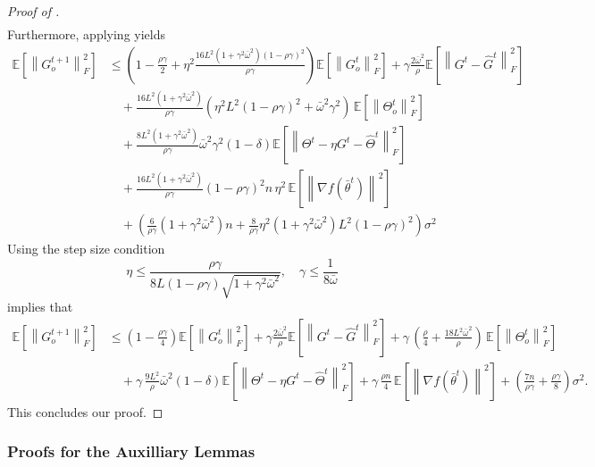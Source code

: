 \documentclass[10pt]{article} %
\theoremstyle{plain}
\theoremstyle{definition}
\theoremstyle{remark}
\newcommand{\prm}{\theta}
\newcommand{\bw}{\bar{\omega}}
\newcommand{\avgtheta}{\bar{\prm}}
\newcommand{\norm}[1]{\left\| #1 \right\|}
\newcommand{\nl}{\nonumber\\}
\begin{document}
\begin{proof}[Proof of ]
\begin{align*}
\end{align*}
Furthermore, applying  yields
\begin{align*}
\mathbb{E} \left[ \norm{G_o^{t+1}}_F^2 \right] & \leq \left( 1 - \frac{ \rho \gamma }{2} + \eta^2 \frac{16L^2 (1 + \gamma^2 \bw^2) ( 1 - \rho \gamma)^2 }{ \rho \gamma } \right) \mathbb{E} \left[ \norm{ G_o^t }_F^2 \right] + \gamma \frac{ 2 \bw^2}{ \rho } \mathbb{E} \left[ \norm{ G^t - \hat{G}^t }_F^2 \right] \nl 
& \quad + \frac{16 L^2 (1 + \gamma^2 \bw^2)}{\rho \gamma} ( \eta^2 L^2 (1 - \rho\gamma)^2 + \bw^2 \gamma^2 ) \, \mathbb{E} \left[ \norm{ \Theta_o^t}_F^2 \right] \nl 
& \quad + \frac{8 L^2(1 + \gamma^2 \bw^2)}{ \rho \gamma } \bw^2 \gamma^2 (1 - \delta) \mathbb{E} \left[ \norm{ \Theta^t - \eta G^t - \hat{\Theta}^t }_F^2 \right] \nl 
& \quad + \frac{16 L^2 (1 + \gamma^2 \bw^2)}{\rho \gamma} (1 - \rho \gamma)^2 n \, \eta^2 \, \mathbb{E} \left[ \norm{ \nabla f( \avgtheta^t ) }^2 \right] \nl 
& \quad + \left( \frac{6}{\rho \gamma} \left( 1 + \gamma^2 \bw^2 \right) n + \frac{8}{\rho \gamma} \eta^2 (1 + \gamma^2 \bw^2) L^2 (1 - \rho \gamma)^2 \right) \sigma^2 
\end{align*}
Using the step size condition 
\begin{equation} \label{eq:eta_gcond_b}
\eta \leq \frac{ \rho \gamma }{ 8L (1-\rho\gamma) \sqrt{1 + \gamma^2 \bw^2} }, \quad \gamma \leq \frac{1}{8 \bw}
\end{equation}
implies that 
\begin{align*}
\mathbb{E} \left[ \norm{G_o^{t+1}}_F^2 \right] & \leq \left( 1 - \frac{ \rho \gamma }{4} \right) \mathbb{E} \left[ \norm{ G_o^t }_F^2 \right] + \gamma \frac{ 2 \bw^2}{ \rho } \mathbb{E} \left[ \norm{ G^t - \hat{G}^t }_F^2 \right] + \gamma \, \left( \frac{\rho}{4} + \frac{18 L^2 \bw^2}{\rho} \right) \, \mathbb{E} \left[ \norm{ \Theta_o^t}_F^2 \right] \nl 
& \quad + \gamma \, \frac{9 L^2}{ \rho } \bw^2 (1 - \delta) \mathbb{E} \left[ \norm{ \Theta^t - \eta G^t - \hat{\Theta}^t }_F^2 \right] + \gamma \, \frac{ \rho n}{4} \, \mathbb{E} \left[ \norm{ \nabla f( \avgtheta^t ) }^2 \right] + \left( \frac{7n }{\rho \gamma} + \frac{\rho \gamma}{8} \right) \sigma^2 .
\end{align*}
This concludes our proof.
\end{proof}

\subsubsection{Proofs for the Auxilliary Lemmas}
\end{document}
